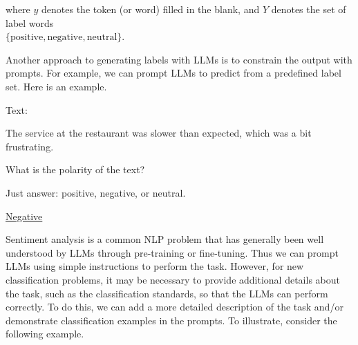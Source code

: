 \noindent where $y$ denotes the token (or word) filled in the blank, and $Y$ denotes the set of label words\\ $\{\mathrm{positive}, \mathrm{negative}, \mathrm{neutral}\}$.

Another approach to generating labels with LLMs is to constrain the output with prompts. For example, we can prompt LLMs to predict from a predefined label set. Here is an example.

\vspace{0.5em}
\begin{tcolorbox}

\begingroup
\setlength{\leftskip}{2em}
\setlength{\rightskip}{2em}


\vspace{0.7em}

Text:

The service at the restaurant was slower than expected, which was a bit frustrating.

\vspace{0.7em}

What is the polarity of the text?

\vspace{0.3em}

Just answer: positive, negative, or neutral.

\vspace{0.7em}

\underline{Negative}

\endgroup

\end{tcolorbox}
\vspace{0.5em}

Sentiment analysis is a common NLP problem that has generally been well understood by LLMs through pre-training or fine-tuning. Thus we can prompt LLMs using simple instructions to perform the task. However, for new classification problems, it may be necessary to provide additional details about the task, such as the classification standards, so that the LLMs can perform correctly. To do this, we can add a more detailed description of the task and/or demonstrate classification examples in the prompts. To illustrate, consider the following example.

